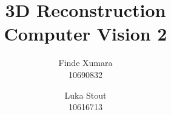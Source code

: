 \documentclass{article}
\title{3D Reconstruction \\ \small{Computer Vision 2}}
\author{Finde Xumara \\ 10690832 \and Luka Stout \\ 10616713}
\begin{document}
\maketitle









{\small
	
}
\end{document}
